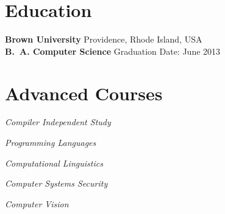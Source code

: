 \documentclass[margin,line]{resume}
\begin{document}
\begin{resume}

  
    \section{\mysidestyle{} Education}

    \textbf{Brown University}    \hfill Providence, Rhode Island, USA     \vspace{2mm}\\
    \textbf{B.\ A. Computer Science}  \hfill Graduation Date: June 2013 \vspace{-3mm}\\\vspace{-1.5mm}%



    \section{\mysidestyle{} Advanced Courses}

    \textsl{Compiler Independent Study}   \par\vspace{-4mm}%
     {\addtolength{\leftskip}{2 mm} 
      \par}
 
     \textsl{Programming Languages} \par\vspace{-4mm}%
    {\addtolength{\leftskip}{2 mm} 
    \par}
    
    \textsl{Computational Linguistics} \par\vspace{-4mm}%
     {\addtolength{\leftskip}{2 mm} 
         \par}
     
    \textsl{Computer Systems Security} \par\vspace{-4mm}%
    {\addtolength{\leftskip}{2 mm} 
    \par}
    
        \textsl{Computer Vision} \par\vspace{-4mm}%
    {\addtolength{\leftskip}{2 mm}  
    \par}
    

\end{resume}
\end{document}

